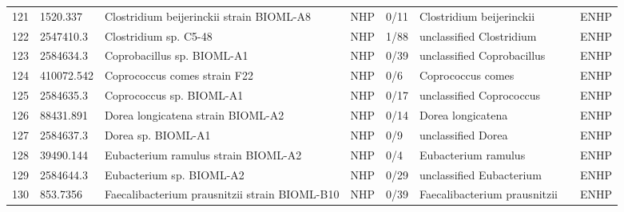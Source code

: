 \begin{longtable}{llllllll}
121 &      1520.337 &                                 Clostridium beijerinckii strain BIOML-A8 &   NHP &      0/11 &                       Clostridium beijerinckii &                \cite{poyet2019library,shi2008transcriptional} &  ENHP \\
122 &     2547410.3 &                                                    Clostridium sp. C5-48 &   NHP &      1/88 &                       unclassified Clostridium &                                              \cite{2547410.3} &  ENHP \\
123 &     2584634.3 &                                               Coprobacillus sp. BIOML-A1 &   NHP &      0/39 &                     unclassified Coprobacillus &                             \cite{poyet2019library,2584634.3} &  ENHP \\
124 &    410072.542 &                                             Coprococcus comes strain F22 &   NHP &       0/6 &                              Coprococcus comes &                                             \cite{410072.542} &  ENHP \\
125 &     2584635.3 &                                                 Coprococcus sp. BIOML-A1 &   NHP &      0/17 &                       unclassified Coprococcus &                             \cite{poyet2019library,2584635.3} &  ENHP \\
126 &     88431.891 &                                        Dorea longicatena strain BIOML-A2 &   NHP &      0/14 &                              Dorea longicatena &             \cite{poyet2019library,taras2002reclassification} &  ENHP \\
127 &     2584637.3 &                                                       Dorea sp. BIOML-A1 &   NHP &       0/9 &                             unclassified Dorea &                             \cite{poyet2019library,2584637.3} &  ENHP \\
128 &     39490.144 &                                      Eubacterium ramulus strain BIOML-A2 &   NHP &       0/4 &                            Eubacterium ramulus &              \cite{poyet2019library,rodriguez2019bacteroides} &  ENHP \\
129 &     2584644.3 &                                                 Eubacterium sp. BIOML-A2 &   NHP &      0/29 &                       unclassified Eubacterium &           \cite{poyet2019library,schwiertz2000quantification} &  ENHP \\
130 &      853.7356 &                            Faecalibacterium prausnitzii strain BIOML-B10 &   NHP &      0/39 &                   Faecalibacterium prausnitzii &             \cite{poyet2019library,lopez2017faecalibacterium} &  ENHP \\

\end{longtable}
